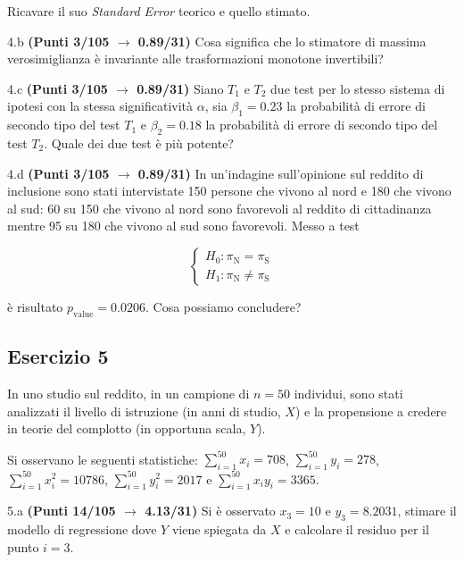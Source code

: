 \documentclass[
  11pt,
]{book}
\theoremstyle{mytheoremstyle}
\theoremstyle{mydefstyle}
\begin{document}
Ricavare il suo \emph{Standard Error} teorico e quello stimato.

4.b \textbf{(Punti 3/105 \(\rightarrow\) 0.89/31)} Cosa significa che lo stimatore di massima verosimiglianza è invariante alle trasformazioni monotone invertibili?

4.c \textbf{(Punti 3/105 \(\rightarrow\) 0.89/31)} Siano \(T_1\) e \(T_2\) due test per lo stesso sistema di ipotesi con la stessa significatività \(\alpha\), sia \(\beta_1=0.23\) la probabilità di errore di secondo tipo del test \(T_1\) e \(\beta_2=0.18\) la probabilità di errore di secondo tipo del test \(T_2\). Quale dei due test è più potente?

4.d \textbf{(Punti 3/105 \(\rightarrow\) 0.89/31)} In un'indagine sull'opinione sul reddito di inclusione sono stati intervistate 150 persone che vivono al nord e 180 che vivono al sud: 60 su 150 che vivono al nord sono favorevoli al reddito di cittadinanza mentre 95 su 180 che vivono al sud sono favorevoli.
Messo a test

\[
\begin{cases}
   H_0: \pi_\text{N} = \pi_\text{S} \\
   H_1: \pi_\text{N} \neq \pi_\text{S} 
\end{cases}
\]

è risultato \(p_{\text{value}} =0.0206\). Cosa possiamo concludere?

\subsection{Esercizio 5}\label{esercizio-5-36}

In uno studio sul reddito, in un campione di \(n=50\) individui, sono stati analizzati il livello di istruzione (in anni di studio, \(X\)) e la propensione a credere in teorie del complotto (in opportuna scala, \(Y\)).

Si osservano le seguenti statistiche:
\(\sum_{i=1}^{50}x_i=708\), \(\sum_{i=1}^{50}y_i=278\),
\(\sum_{i=1}^{50}x_i^2=10786\), \(\sum_{i=1}^{50}y_i^2=2017\) e \(\sum_{i=1}^{50}x_iy_i=3365\).

5.a \textbf{(Punti 14/105 \(\rightarrow\) 4.13/31)} Si è osservato \(x_3=10\) e \(y_3=8.2031\), stimare il modello di regressione dove \(Y\) viene spiegata da \(X\) e calcolare il residuo per il punto \(i=3\).
\end{document}
